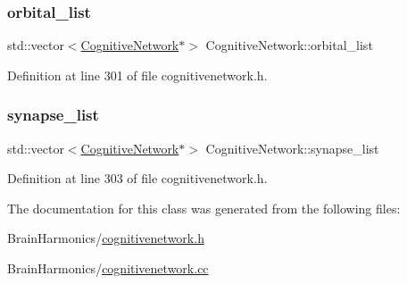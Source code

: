 \subsubsection{\texorpdfstring{orbital\+\_\+list}{orbital\_list}}
{\footnotesize\ttfamily std\+::vector$<$\hyperlink{class_cognitive_network}{Cognitive\+Network}$\ast$$>$ Cognitive\+Network\+::orbital\+\_\+list\hspace{0.3cm}{\ttfamily [protected]}}



Definition at line 301 of file cognitivenetwork.\+h.

\mbox{\label{class_cognitive_network_a9218de9d63b10b313df289d1312c81e0}} 
\subsubsection{\texorpdfstring{synapse\+\_\+list}{synapse\_list}}
{\footnotesize\ttfamily std\+::vector$<$\hyperlink{class_cognitive_network}{Cognitive\+Network}$\ast$$>$ Cognitive\+Network\+::synapse\+\_\+list\hspace{0.3cm}{\ttfamily [protected]}}



Definition at line 303 of file cognitivenetwork.\+h.



The documentation for this class was generated from the following files\+:\begin{DoxyCompactItemize}
\item 
Brain\+Harmonics/\hyperlink{cognitivenetwork_8h}{cognitivenetwork.\+h}\item 
Brain\+Harmonics/\hyperlink{cognitivenetwork_8cc}{cognitivenetwork.\+cc}\end{DoxyCompactItemize}
